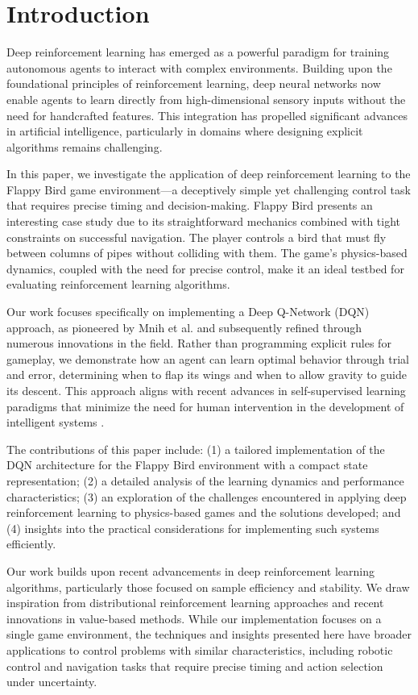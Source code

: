 \section{Introduction}

Deep reinforcement learning has emerged as a powerful paradigm for training autonomous agents to interact with complex environments. Building upon the foundational principles of reinforcement learning, deep neural networks now enable agents to learn directly from high-dimensional sensory inputs without the need for handcrafted features. This integration has propelled significant advances in artificial intelligence, particularly in domains where designing explicit algorithms remains challenging.

In this paper, we investigate the application of deep reinforcement learning to the Flappy Bird game environment—a deceptively simple yet challenging control task that requires precise timing and decision-making. Flappy Bird presents an interesting case study due to its straightforward mechanics combined with tight constraints on successful navigation. The player controls a bird that must fly between columns of pipes without colliding with them. The game's physics-based dynamics, coupled with the need for precise control, make it an ideal testbed for evaluating reinforcement learning algorithms.

Our work focuses specifically on implementing a Deep Q-Network (DQN) approach, as pioneered by Mnih et al. \cite{mnih2015human} and subsequently refined through numerous innovations in the field. Rather than programming explicit rules for gameplay, we demonstrate how an agent can learn optimal behavior through trial and error, determining when to flap its wings and when to allow gravity to guide its descent. This approach aligns with recent advances in self-supervised learning paradigms that minimize the need for human intervention in the development of intelligent systems \cite{hafner2023mastering}.

The contributions of this paper include: (1) a tailored implementation of the DQN architecture for the Flappy Bird environment with a compact state representation; (2) a detailed analysis of the learning dynamics and performance characteristics; (3) an exploration of the challenges encountered in applying deep reinforcement learning to physics-based games and the solutions developed; and (4) insights into the practical considerations for implementing such systems efficiently.

Our work builds upon recent advancements in deep reinforcement learning algorithms, particularly those focused on sample efficiency and stability. We draw inspiration from distributional reinforcement learning approaches \cite{dabney2020distributional} and recent innovations in value-based methods. While our implementation focuses on a single game environment, the techniques and insights presented here have broader applications to control problems with similar characteristics, including robotic control and navigation tasks that require precise timing and action selection under uncertainty.

